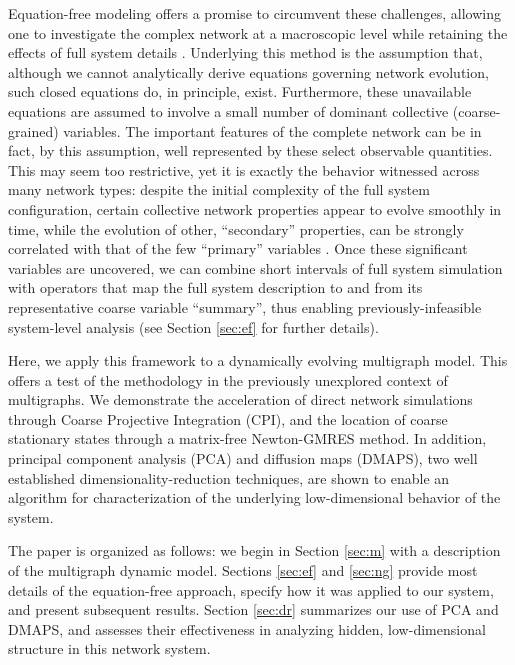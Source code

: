 Equation-free modeling offers a promise to circumvent these
challenges, allowing one to investigate the complex network at a
macroscopic level while retaining the effects of full system details
\cite{kevrekidis_equation-free:_2004,gear_equation-free_2003}.
%
Underlying this method is the assumption that, although we cannot
analytically derive equations governing network evolution, such closed
equations do, in principle, exist.
%
Furthermore, these unavailable equations are assumed to involve a
small number of dominant collective (coarse-grained) variables.
%
The important features of the complete network can be in fact, by this
assumption, well represented by these select observable quantities.
%
This may seem too restrictive, yet it is exactly the behavior
witnessed across many network types: despite the initial complexity of
the full system configuration, certain collective network properties
appear to evolve smoothly in time, while the evolution of other,
``secondary'' properties, can be strongly correlated with that of the
few ``primary'' variables
\cite{bold_equation-free_2014,rajendran_coarse_2011,siettos_equation-free_2011}.
%
Once these significant variables are uncovered, we can combine short
intervals of full system simulation with operators that map the full
system description to and from its representative coarse variable
``summary'', thus enabling previously-infeasible system-level analysis
(see Section \ref{sec:ef} for further details). \par

Here, we apply this framework to a dynamically evolving multigraph
model.
%
This offers a test of the methodology in the previously unexplored
context of multigraphs.
%
We demonstrate the acceleration of direct network simulations through
Coarse Projective Integration (CPI), and the location of coarse
stationary states through a matrix-free Newton-GMRES method.
%
In addition, principal component analysis (PCA) and diffusion maps
(DMAPS), two well established dimensionality-reduction techniques, are
shown to enable an algorithm for characterization of the underlying
low-dimensional behavior of the system. \par

The paper is organized as follows: we begin in Section \ref{sec:m}
with a description of the multigraph dynamic model.
%
Sections \ref{sec:ef} and \ref{sec:ng} provide most details of the
equation-free approach, specify how it was applied to our system, and
present subsequent results.
%
Section \ref{sec:dr} summarizes our use of PCA and DMAPS, and assesses
their effectiveness in analyzing hidden, low-dimensional structure in
this network system.

